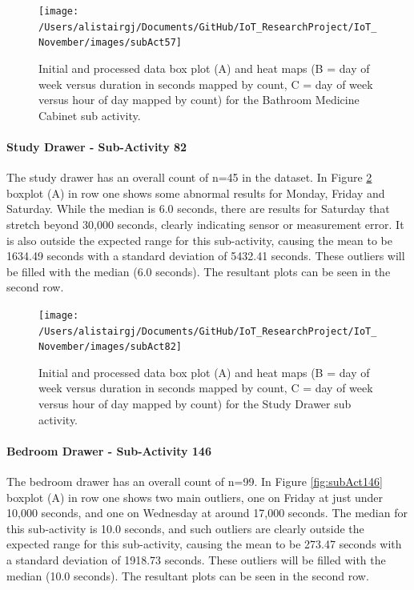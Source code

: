 \documentclass[11pt,]{article}
\let\oldparagraph\paragraph
\renewcommand{\paragraph}[1]{\oldparagraph{#1}\mbox{}}
\begin{document}
\begin{figure}[H]

{\centering \texttt{[image: /Users/alistairgj/Documents/GitHub/IoT\_ResearchProject/IoT\_November/images/subAct57]} 

}

\caption{Initial and processed data box plot (A) and heat maps (B = day of week versus duration in seconds mapped by count, C = day of week versus hour of day mapped by count) for the Bathroom Medicine Cabinet sub activity.}\label{fig:subAct57}
\end{figure}

\hypertarget{study-drawer---sub-activity-82}{%
\paragraph{Study Drawer - Sub-Activity
82}\label{study-drawer---sub-activity-82}}

The study drawer has an overall count of n=45 in the dataset. In Figure
\ref{fig:subAct82} boxplot (A) in row one shows some abnormal results
for Monday, Friday and Saturday. While the median is 6.0 seconds, there
are results for Saturday that stretch beyond 30,000 seconds, clearly
indicating sensor or measurement error. It is also outside the expected
range for this sub-activity, causing the mean to be 1634.49 seconds with
a standard deviation of 5432.41 seconds. These outliers will be filled
with the median (6.0 seconds). The resultant plots can be seen in the
second row.

\begin{figure}[H]

{\centering \texttt{[image: /Users/alistairgj/Documents/GitHub/IoT\_ResearchProject/IoT\_November/images/subAct82]} 

}

\caption{Initial and processed data box plot (A) and heat maps (B = day of week versus duration in seconds mapped by count, C = day of week versus hour of day mapped by count) for the Study Drawer sub activity.}\label{fig:subAct82}
\end{figure}

\hypertarget{bedroom-drawer---sub-activity-146}{%
\paragraph{Bedroom Drawer - Sub-Activity
146}\label{bedroom-drawer---sub-activity-146}}

The bedroom drawer has an overall count of n=99. In Figure
\ref{fig:subAct146} boxplot (A) in row one shows two main outliers, one
on Friday at just under 10,000 seconds, and one on Wednesday at around
17,000 seconds. The median for this sub-activity is 10.0 seconds, and
such outliers are clearly outside the expected range for this
sub-activity, causing the mean to be 273.47 seconds with a standard
deviation of 1918.73 seconds. These outliers will be filled with the
median (10.0 seconds). The resultant plots can be seen in the second
row.
\end{document}
